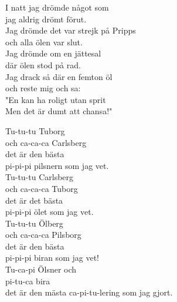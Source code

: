 \documentclass[a6paper,10pt]{article}
\begin{document}
\setlength{\oddsidemargin}{-0.47in}
\begin{center}
\end{center}
\begin{lyrics}
I natt jag drömde något som\\
jag aldrig drömt förut.\\
Jag drömde det var strejk på Pripps\\
och alla ölen var slut.
\vspace{5pt}\\
Jag drömde om en jättesal\\
där ölen stod på rad.\\
Jag drack så där en femton öl\\
och reste mig och sa:
\vspace{5pt}\\
"En kan ha roligt utan sprit\\
Men det är dumt att chansa!"
\end{lyrics}
\begin{center}
\end{center}
\begin{lyrics}
Tu-tu-tu Tuborg\\
och ca-ca-ca Carlsberg\\
det är den bästa \\
pi-pi-pi pilsnern som jag vet.
\vspace{5pt} \\
Tu-tu-tu Carlsberg\\
och ca-ca-ca Tuborg\\
det är det bästa\\
pi-pi-pi ölet som jag vet.
\vspace{5pt} \\
Tu-tu-tu Ölberg\\
och ca-ca-ca Pilsborg\\
det är den bästa \\
pi-pi-pi biran som jag vet!
\vspace{5pt}\\
Tu-ca-pi Ölsner och \\
pi-tu-ca bira\\
det är den mästa ca-pi-tu-lering som jag gjort.
\end{lyrics}
\end{document}
